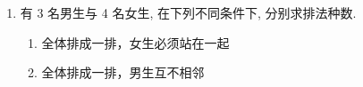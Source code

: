 \begin{enumerate}
\begin{enumerate}
\begin{enumerate}
            \item 男、女相间的站法有多少种？
            
            \item 甲、乙、丙三人从左到右顺序一定的站法有多少种？
        \end{enumerate}
        \begin{jieda}
            \begin{enumerate}
                \item 甲不在中间也不在两端，故甲可选 4 个位置，其余六人可排除 $P_{6}^{6}$ 种，

                故共有 $4P_{6}^{6} = {2880}$ 种
                
                \item 先排男生，共有 $P_{3}^{3}$ 种，则女生可在男生排完后的四个空中选择四个，即有 $P_{4}^{4}$ 种，故共有 $P_{3}^{3}P_{4}^{4} = {144}$ 种

                \item 全部排好共有$A_7^7$种，由甲、乙、丙三人顺序一定，共有故 $\dfrac{P_{7}^{7}}{P_{3}^{3}} = {840}$ 种.
            \end{enumerate}
        \end{jieda}
        
        \item 有 3 名男生与 4 名女生, 在下列不同条件下, 分别求排法种数.
        \begin{enumerate}
            \item 全体排成一排，女生必须站在一起
            
            \item 全体排成一排，男生互不相邻
            

\end{enumerate}
\end{enumerate}
\end{enumerate}
